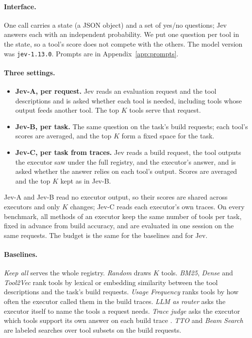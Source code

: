 \documentclass[11pt]{tea}
\newcommand{\JA}{Jev-A}
\newcommand{\JB}{Jev-B}
\newcommand{\JC}{Jev-C}
\begin{document}
\paragraph{Interface.}
One call carries a state (a JSON object) and a set of yes/no questions; Jev answers each with an independent probability. We put one question per tool in the state, so a tool's score does not compete with the others. The model version was \texttt{jev-1.13.0}. Prompts are in Appendix~\ref{app:prompts}.

\paragraph{Three settings.}
\begin{itemize}[leftmargin=*,itemsep=1pt,topsep=2pt]
  \item \textbf{\JA{}, per request.} Jev reads an evaluation request and the tool descriptions and is asked whether each tool is needed, including tools whose output feeds another tool. The top $K$ tools serve that request.
  \item \textbf{\JB{}, per task.} The same question on the task's build requests; each tool's scores are averaged, and the top $K$ form a fixed space for the task.
  \item \textbf{\JC{}, per task from traces.} Jev reads a build request, the tool outputs the executor saw under the full registry, and the executor's answer, and is asked whether the answer relies on each tool's output. Scores are averaged and the top $K$ kept as in \JB{}.
\end{itemize}
\JA{} and \JB{} read no executor output, so their scores are shared across executors and only $K$ changes; \JC{} reads each executor's own traces. On every benchmark, all methods of an executor keep the same number of tools per task, fixed in advance from build accuracy, and are evaluated in one session on the same requests. The budget is the same for the baselines and for Jev.

\paragraph{Baselines.}
\emph{Keep all} serves the whole registry. \emph{Random} draws $K$ tools. \emph{BM25}, \emph{Dense} \citep{xiao2024cpack} and \emph{Tool2Vec} \citep{tool2vec} rank tools by lexical or embedding similarity between the tool descriptions and the task's build requests. \emph{Usage Frequency} ranks tools by how often the executor called them in the build traces. \emph{LLM as router} asks the executor itself to name the tools a request needs. \emph{Trace judge} asks the executor which tools support its own answer on each build trace \citep{zheng2023judging}. \emph{TTO} and \emph{Beam Search} are labeled searches over tool subsets on the build requests.
\end{document}
